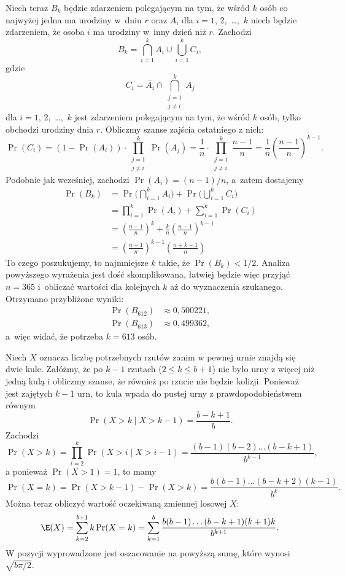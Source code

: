 Niech teraz $B_k$ będzie zdarzeniem polegającym na tym, że wśród $k$ osób co najwyżej jedna ma urodziny w~dniu $r$ oraz $A_i$ dla $i=1$, 2,~\dots,~$k$ niech będzie zdarzeniem, że osoba $i$ ma urodziny w~inny dzień niż $r$. Zachodzi
\[
	B_k = \bigcap_{i=1}^kA_i\cup\bigcup_{i=1}^kC_i,
\]
gdzie
\[
	C_i = \overline{A_i}\cap\bigcap_{\substack{j=1\\j\ne i}}^kA_j
\]
dla $i=1$, 2,~\dots,~$k$ jest zdarzeniem polegającym na tym, że wśród $k$ osób, tylko  obchodzi urodziny dnia $r$. Obliczmy szanse zajścia ostatniego z nich:
\[
	\Pr(C_i) = (1-\Pr(A_i))\cdot\prod_{\substack{j=1\\j\ne i}}^k\Pr(A_j) = \frac{1}{n}\cdot\prod_{\substack{j=1\\j\ne i}}^k\frac{n-1}{n} = \frac{1}{n}\left(\frac{n-1}{n}\right)^{k-1}.
\]
Podobnie jak wcześniej, zachodzi $\Pr(A_i)=(n-1)/n$, a~zatem dostajemy
\begin{align*}
	\Pr(B_k) &= \Pr\biggl(\bigcap_{i=1}^kA_i\biggr)+\Pr\biggl(\bigcup_{i=1}^kC_i\biggr) \\
	&= \prod_{i=1}^k\Pr(A_i)+\sum_{i=1}^k\Pr(C_i) \\
	&= \left(\frac{n-1}{n}\right)^k+\frac{k}{n}\left(\frac{n-1}{n}\right)^{k-1} \\
	&= \left(\frac{n-1}{n}\right)^{k-1}\left(\frac{n+k-1}{n}\right)
\end{align*}
To czego poszukujemy, to najmniejsze $k$ takie, że $\Pr(B_k)<1/2$. Analiza powyższego wyrażenia jest dość skomplikowana, łatwiej będzie więc przyjąć $n=365$ i~obliczać wartości dla kolejnych $k$ aż do wyznaczenia szukanego. Otrzymano przybliżone wyniki:
\begin{align*}
    \Pr(B_{612}) &\approx 0{,}500221,\\
	\Pr(B_{613}) &\approx 0{,}499362,
\end{align*}
a~więc widać, że potrzeba $k=613$ osób.

\exercise %
Niech $X$ oznacza liczbę potrzebnych rzutów zanim w pewnej urnie znajdą się dwie kule. Załóżmy, że po $k-1$ rzutach ($2\le k\le b+1$) nie było urny z więcej niż jedną kulą i obliczmy szanse, że również po  rzucie nie będzie kolizji. Ponieważ jest zajętych $k-1$ urn, to  kula wpada do pustej urny z prawdopodobieństwem równym
\[
    \Pr(X>k\mid X>k-1) = \frac{b-k+1}{b}.
\]
Zachodzi
\[
    \Pr(X>k) = \prod_{i=2}^k\Pr(X>i\mid X>i-1) = \frac{(b-1)(b-2)\dots(b-k+1)}{b^{k-1}},
\]
a ponieważ $\Pr(X>1)=1$, to mamy
\[
    \Pr(X=k) = \Pr(X>k-1)-\Pr(X>k) = \frac{b(b-1)\dots(b-k+2)(k-1)}{b^k}.
\]
Można teraz obliczyć wartość oczekiwaną zmiennej losowej $X$:
\[
    \E(X) = \sum_{k=2}^{b+1}k\Pr(X=k) = \sum_{k=1}^b\frac{b(b-1)\dots(b-k+1)(k+1)k}{b^{k+1}}.
\]
W pozycji \cite{taocp1frag} wyprowadzone jest oszacowanie na powyższą sumę, które wynosi $\sqrt{b\pi/2}$.

